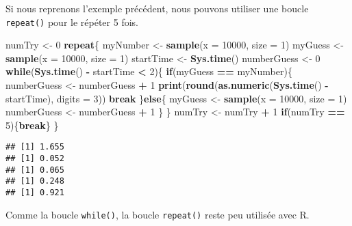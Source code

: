 \documentclass[]{book}
\newenvironment{Shaded}{\begin{snugshade}}{\end{snugshade}}
\newcommand{\KeywordTok}[1]{\textcolor[rgb]{0.13,0.29,0.53}{\textbf{#1}}}
\newcommand{\DataTypeTok}[1]{\textcolor[rgb]{0.13,0.29,0.53}{#1}}
\newcommand{\DecValTok}[1]{\textcolor[rgb]{0.00,0.00,0.81}{#1}}
\newcommand{\StringTok}[1]{\textcolor[rgb]{0.31,0.60,0.02}{#1}}
\newcommand{\ControlFlowTok}[1]{\textcolor[rgb]{0.13,0.29,0.53}{\textbf{#1}}}
\newcommand{\OperatorTok}[1]{\textcolor[rgb]{0.81,0.36,0.00}{\textbf{#1}}}
\newcommand{\NormalTok}[1]{#1}
\theoremstyle{definition}
\theoremstyle{definition}
\theoremstyle{definition}
\theoremstyle{remark}
\begin{document}
Si nous reprenons l'exemple précédent, nous pouvons utiliser une boucle
\texttt{repeat()} pour le répéter 5 fois.

\begin{Shaded}
\begin{Highlighting}[]
\NormalTok{numTry <-}\StringTok{ }\DecValTok{0}
\ControlFlowTok{repeat}\NormalTok{\{}
\NormalTok{  myNumber <-}\StringTok{ }\KeywordTok{sample}\NormalTok{(}\DataTypeTok{x =} \DecValTok{10000}\NormalTok{, }\DataTypeTok{size =} \DecValTok{1}\NormalTok{)}
\NormalTok{  myGuess <-}\StringTok{ }\KeywordTok{sample}\NormalTok{(}\DataTypeTok{x =} \DecValTok{10000}\NormalTok{, }\DataTypeTok{size =} \DecValTok{1}\NormalTok{)}
\NormalTok{  startTime <-}\StringTok{ }\KeywordTok{Sys.time}\NormalTok{()}
\NormalTok{  numberGuess <-}\StringTok{ }\DecValTok{0}
  \ControlFlowTok{while}\NormalTok{(}\KeywordTok{Sys.time}\NormalTok{() }\OperatorTok{-}\StringTok{ }\NormalTok{startTime }\OperatorTok{<}\StringTok{ }\DecValTok{2}\NormalTok{)\{}
    \ControlFlowTok{if}\NormalTok{(myGuess }\OperatorTok{==}\StringTok{ }\NormalTok{myNumber)\{}
\NormalTok{      numberGuess <-}\StringTok{ }\NormalTok{numberGuess }\OperatorTok{+}\StringTok{ }\DecValTok{1}
      \KeywordTok{print}\NormalTok{(}\KeywordTok{round}\NormalTok{(}\KeywordTok{as.numeric}\NormalTok{(}\KeywordTok{Sys.time}\NormalTok{() }\OperatorTok{-}\StringTok{ }\NormalTok{startTime), }\DataTypeTok{digits =} \DecValTok{3}\NormalTok{))}
      \ControlFlowTok{break}
\NormalTok{    \}}\ControlFlowTok{else}\NormalTok{\{}
\NormalTok{      myGuess <-}\StringTok{ }\KeywordTok{sample}\NormalTok{(}\DataTypeTok{x =} \DecValTok{10000}\NormalTok{, }\DataTypeTok{size =} \DecValTok{1}\NormalTok{)}
\NormalTok{      numberGuess <-}\StringTok{ }\NormalTok{numberGuess }\OperatorTok{+}\StringTok{ }\DecValTok{1}
\NormalTok{    \}}
\NormalTok{  \}}
\NormalTok{  numTry <-}\StringTok{ }\NormalTok{numTry }\OperatorTok{+}\StringTok{ }\DecValTok{1}
  \ControlFlowTok{if}\NormalTok{(numTry }\OperatorTok{==}\StringTok{ }\DecValTok{5}\NormalTok{)\{}\ControlFlowTok{break}\NormalTok{\}}
\NormalTok{\}}
\end{Highlighting}
\end{Shaded}

\begin{verbatim}
## [1] 1.655
## [1] 0.052
## [1] 0.065
## [1] 0.248
## [1] 0.921
\end{verbatim}

Comme la boucle \texttt{while()}, la boucle \texttt{repeat()} reste peu
utilisée avec R.
\end{document}
